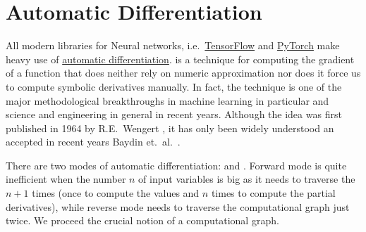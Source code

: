 \section{Automatic Differentiation}
All modern libraries for Neural networks, i.e.~\href{https://www.tensorflow.org}{TensorFlow} and
\href{https://pytorch.org}{PyTorch} make heavy use of
\href{https://en.wikipedia.org/wiki/Automatic_differentiation}{automatic differentiation}.
 is a technique for computing the gradient of a function that does neither rely
on numeric approximation nor does it force us to compute symbolic derivatives manually.  In fact, the technique
is one of the major methodological breakthroughs in machine learning in particular and science and engineering
in general in recent years.  Although the idea was first published in 1964 by R.E.~Wengert \cite{wengert:1964},
it has only been widely understood an accepted in recent years Baydin et.~al.~\cite{baydin:2018}.

There are two modes of automatic differentiation:   and .  Forward
mode is quite inefficient when the number $n$ of input variables is big as it needs to traverse the
 $n+1$ times (once to compute the values and $n$ times to compute the partial
derivatives), while reverse mode needs to traverse the computational graph just twice.  We proceed the crucial
notion of a computational graph.

